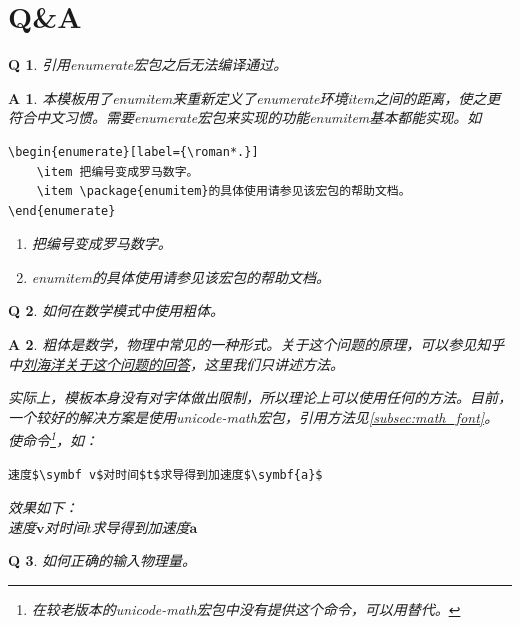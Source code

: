 \documentclass{LZU}
\newcommand{\package}[1]{{\sffamily #1}}
\newtheorem*{answer}{A}
\newtheorem{question}{Q}
\begin{document}
\section{Q\&A}
\begin{question}
    引用\package{enumerate}宏包之后无法编译通过。
\end{question}
\begin{answer}
    本模板用了\package{enumitem}来重新定义了enumerate环境item之间的距离，使之更符合中文习惯。需要\package{enumerate}宏包来实现的功能\package{enumitem}基本都能实现。如
\begin{verbatim}
\begin{enumerate}[label={\roman*.}]
    \item 把编号变成罗马数字。
    \item \package{enumitem}的具体使用请参见该宏包的帮助文档。
\end{enumerate}
\end{verbatim}
    \begin{enumerate}[label={\roman*.}]
        \item 把编号变成罗马数字。
        \item \package{enumitem}的具体使用请参见该宏包的帮助文档。
    \end{enumerate}
\end{answer}
\begin{question}
    如何在数学模式中使用粗体。
\end{question}
\begin{answer}
    粗体是数学，物理中常见的一种形式。关于这个问题的原理，可以参见知乎中\href{https://www.zhihu.com/question/25290041/answer/30422583}{刘海洋关于这个问题的回答}\supercite{mathboldfont}，这里我们只讲述方法。

    实际上，模板本身没有对字体做出限制，所以理论上可以使用任何的方法。目前，一个较好的解决方案是使用\package{unicode-math}宏包，引用方法见\cref{subsec:math_font}。使\texttt{\symbf}命令\footnote{在较老版本的\package{unicode-math}宏包中没有提供这个命令，可以用\texttt{\mathbf}替代。}，如：
\begin{verbatim}
速度$\symbf v$对时间$t$求导得到加速度$\symbf{a}$
\end{verbatim}
效果如下：\\
速度$\symbf v$对时间$t$求导得到加速度$\symbf{a}$
\end{answer}
\begin{question}
    如何正确的输入物理量。
\end{question}
\end{document}
